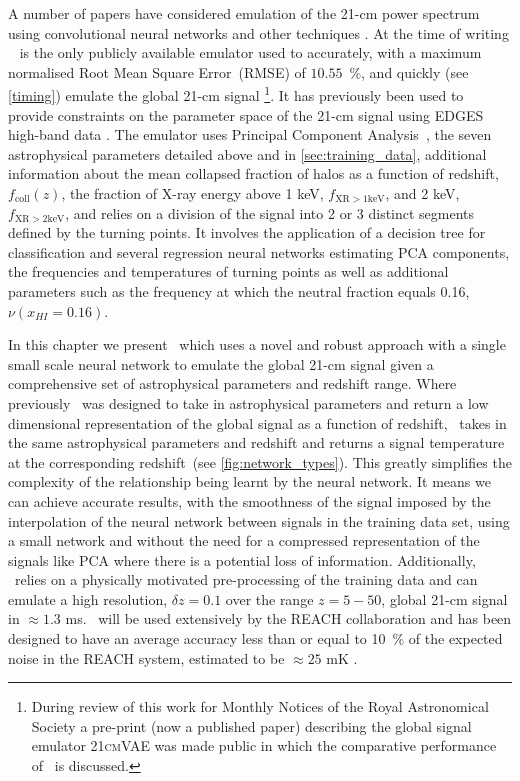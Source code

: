 A number of papers have considered emulation of the 21-cm power spectrum using convolutional neural networks and other techniques \citep[e.g. ][]{Schmit2018, Jennings2018, Mondal_LOFAR_2020}. At the time of writing \cmGEM~ is the only publicly available emulator used to accurately, with a maximum normalised Root Mean Square Error~(RMSE) of $10.55$~\%, and quickly (see \cref{timing}) emulate the global 21-cm signal \citep{Cohen2020} \footnote{During review of this work for Monthly Notices of the Royal Astronomical Society a pre-print (now a published paper) describing the global signal emulator \textsc{21cmVAE} was made public \citep{21cmVAE} in which the comparative performance of \name~is discussed.}. It has previously been used to provide constraints on the parameter space of the 21-cm signal using EDGES high-band data \citep{Monsalve_EDGES_HB_3_2019}. The emulator uses Principal Component Analysis~\citep[PCA,][]{Pearson1901}, the seven astrophysical parameters detailed above and in \cref{sec:training_data}, additional information about the mean collapsed fraction of halos as a function of redshift, $f_\mathrm{coll}(z)$, the fraction of X-ray energy above 1 keV, $f_{\mathrm{XR} > 1 \mathrm{keV}}$, and 2 keV, $f_{\mathrm{XR} > 2 \mathrm{keV}}$, and relies on a division of the signal into 2 or 3 distinct segments defined by the turning points. It involves the application of a decision tree for classification and several regression neural networks estimating PCA components, the frequencies and temperatures of turning points as well as additional parameters such as the frequency at which the neutral fraction equals 0.16, $\nu(x_{HI} = 0.16)$.

In this chapter we present \name~which uses a novel and robust approach with a single small scale neural network to emulate the global 21-cm signal given a comprehensive set of astrophysical parameters and redshift range. Where previously \cmGEM~was designed to take in astrophysical parameters and return a low dimensional representation of the global signal as a function of redshift, \name~takes in the same astrophysical parameters and redshift and returns a signal temperature at the corresponding redshift~(see \cref{fig:network_types}). This greatly simplifies the complexity of the relationship being learnt by the neural network. It means we can achieve accurate results, with the smoothness of the signal imposed by the interpolation of the neural network between signals in the training data set, using a small network and without the need for a compressed representation of the signals like PCA where there is a potential loss of information. Additionally, \name~relies on a physically motivated pre-processing of the training data and can emulate a high resolution, $\delta z = 0.1$ over the range $z = 5 - 50$, global 21-cm signal in $\approx1.3$ ms. \name~will be used extensively by the REACH collaboration and has been designed to have an average accuracy less than or equal to 10~\% of the expected noise in the REACH system, estimated to be $\approx25$ mK \cite{de_lera_acedo_reach_2022}.

